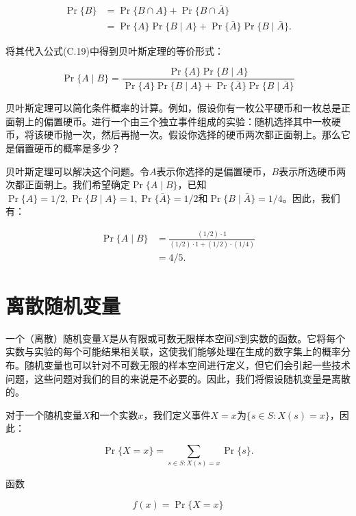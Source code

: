 \documentclass[lang=cn,newtx,10pt,scheme=chinese]{elegantbook}
\begin{document}
$$
\begin{aligned}
\operatorname{Pr}\{B\} & =\operatorname{Pr}\{B \cap A\}+\operatorname{Pr}\{B \cap \bar{A}\} \\
& =\operatorname{Pr}\{A\} \operatorname{Pr}\{B \mid A\}+\operatorname{Pr}\{\bar{A}\} \operatorname{Pr}\{B \mid \bar{A}\} .
\end{aligned}
$$

将其代入公式(C.19)中得到贝叶斯定理的等价形式：

$$
\operatorname{Pr}\{A \mid B\}=\frac{\operatorname{Pr}\{A\} \operatorname{Pr}\{B \mid A\}}{\operatorname{Pr}\{A\} \operatorname{Pr}\{B \mid A\}+\operatorname{Pr}\{\bar{A}\} \operatorname{Pr}\{B \mid \bar{A}\}}
$$

贝叶斯定理可以简化条件概率的计算。例如，假设你有一枚公平硬币和一枚总是正面朝上的偏置硬币。进行一个由三个独立事件组成的实验：随机选择其中一枚硬币，将该硬币抛一次，然后再抛一次。假设你选择的硬币两次都正面朝上。那么它是偏置硬币的概率是多少？

贝叶斯定理可以解决这个问题。令$A$表示你选择的是偏置硬币，$B$表示所选硬币两次都正面朝上。我们希望确定$\operatorname{Pr}\{A \mid B\}$，已知$\operatorname{Pr}\{A\}=1 / 2, \operatorname{Pr}\{B \mid A\}=1, \operatorname{Pr}\{\bar{A}\}=1 / 2$和$\operatorname{Pr}\{B \mid \bar{A}\}=1 / 4$。因此，我们有：

$$
\begin{aligned}
\operatorname{Pr}\{A \mid B\} & =\frac{(1 / 2) \cdot 1}{(1 / 2) \cdot 1+(1 / 2) \cdot(1 / 4)} \\
& =4 / 5 .
\end{aligned}
$$

\section{离散随机变量}\label{section:C.3}

一个（离散）随机变量$X$是从有限或可数无限样本空间$S$到实数的函数。它将每个实数与实验的每个可能结果相关联，这使我们能够处理在生成的数字集上的概率分布。随机变量也可以针对不可数无限的样本空间进行定义，但它们会引起一些技术问题，这些问题对我们的目的来说是不必要的。因此，我们将假设随机变量是离散的。

对于一个随机变量$X$和一个实数$x$，我们定义事件$X=x$为$\{s \in S: X(s)=x\}$，因此：

$$
\operatorname{Pr}\{X=x\}=\sum_{s \in S: X(s)=x} \operatorname{Pr}\{s\} .
$$

函数

$$
f(x)=\operatorname{Pr}\{X=x\}
$$
\end{document}

